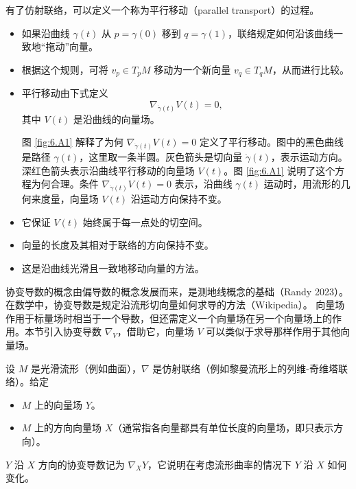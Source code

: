有了仿射联络，可以定义一个称为平行移动（parallel transport）的过程。
\begin{itemize}
\item 如果沿曲线 $\gamma(t)$ 从 $p=\gamma(0)$ 移到 $q=\gamma(1)$，联络规定如何沿该曲线一致地“拖动”向量。
\item 根据这个规则，可将 $v_p\in T_pM$ 移动为一个新向量 $v_q\in T_qM$，从而进行比较。
\item 平行移动由下式定义
\[
  \nabla_{\dot\gamma(t)}V(t)=0,
\]
其中 $V(t)$ 是沿曲线的向量场。

图 \ref{fig:6.A1} 解释了为何 $\nabla_{\dot\gamma(t)}V(t)=0$ 定义了平行移动。图中的黑色曲线是路径 $\gamma(t)$，这里取一条半圆。灰色箭头是切向量 $\dot\gamma(t)$，表示运动方向。深红色箭头表示沿曲线平行移动的向量场 $V(t)$。图 \ref{fig:6.A1} 说明了这个方程为何合理。条件 $\nabla_{\dot\gamma(t)}V(t)=0$ 表示，沿曲线 $\gamma(t)$ 运动时，用流形的几何来度量，向量场 $V(t)$ 沿运动方向保持不变。
\item 它保证 $V(t)$ 始终属于每一点处的切空间。
\item 向量的长度及其相对于联络的方向保持不变。%
\item 这是沿曲线光滑且一致地移动向量的方法。
\end{itemize}

\begin{figure}[tbp]
\centering

\end{figure}

协变导数的概念由偏导数的概念发展而来，是测地线概念的基础（Randy 2023）。在数学中，协变导数是规定沿流形切向量如何求导的方法（Wikipedia）。
向量场作用于标量场时相当于一个导数，但还需定义一个向量场在另一个向量场上的作用。本节引入协变导数 $\nabla_V$，借助它，向量场 $V$ 可以类似于求导那样作用于其他向量场。

设 $M$ 是光滑流形（例如曲面），$\nabla$ 是仿射联络（例如黎曼流形上的列维-奇维塔联络）。给定
\begin{itemize}
\item $M$ 上的向量场 $Y$。
\item $M$ 上的方向向量场 $X$（通常指各向量都具有单位长度的向量场，即只表示方向）。
\end{itemize}
$Y$ 沿 $X$ 方向的协变导数记为 $\nabla_XY$，它说明在考虑流形曲率的情况下 $Y$ 沿 $X$ 如何变化。

